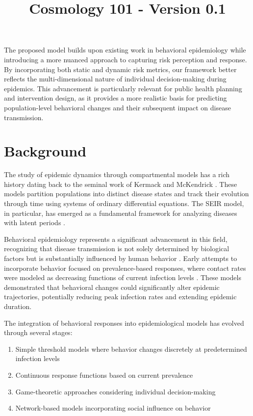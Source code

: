 \documentclass{article}\usepackage{graphicx} \usepackage{amsmath} \usepackage{colortbl}\title{Cosmology 101 - Version 0.1}
\begin{document}
The proposed model builds upon existing work in behavioral epidemiology \cite{verelst2016behavioural} while introducing a more nuanced approach to capturing risk perception and response. By incorporating both static and dynamic risk metrics, our framework better reflects the multi-dimensional nature of individual decision-making during epidemics. This advancement is particularly relevant for public health planning and intervention design, as it provides a more realistic basis for predicting population-level behavioral changes and their subsequent impact on disease transmission.\section{Background}
The study of epidemic dynamics through compartmental models has a rich history dating back to the seminal work of Kermack and McKendrick \cite{anderson1992infectious}. These models partition populations into distinct disease states and track their evolution through time using systems of ordinary differential equations. The SEIR model, in particular, has emerged as a fundamental framework for analyzing diseases with latent periods \cite{hethcote2000mathematics}.

Behavioral epidemiology represents a significant advancement in this field, recognizing that disease transmission is not solely determined by biological factors but is substantially influenced by human behavior \cite{verelst2016behavioural}. Early attempts to incorporate behavior focused on prevalence-based responses, where contact rates were modeled as decreasing functions of current infection levels \cite{funk2010modelling}. These models demonstrated that behavioral changes could significantly alter epidemic trajectories, potentially reducing peak infection rates and extending epidemic duration.

The integration of behavioral responses into epidemiological models has evolved through several stages:

\begin{enumerate}
\item Simple threshold models where behavior changes discretely at predetermined infection levels
\item Continuous response functions based on current prevalence
\item Game-theoretic approaches considering individual decision-making
\item Network-based models incorporating social influence on behavior
\end{enumerate}
\end{document}
